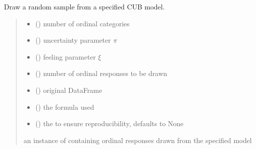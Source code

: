 \documentclass[letterpaper,10pt,english]{sphinxmanual}
\begin{document}
\begin{fulllineitems}
\label{\detokenize{cubmods:cubmods.cub.draw}}
\pysigstartsignatures
{}
\pysigstopsignatures
\sphinxAtStartPar
Draw a random sample from a specified CUB model.
\begin{quote}\begin{description}
\begin{itemize}
\item {} 
\sphinxAtStartPar
{} () \textendash{} number of ordinal categories

\item {} 
\sphinxAtStartPar
{} () \textendash{} uncertainty parameter \(\pi\)

\item {} 
\sphinxAtStartPar
{} () \textendash{} feeling parameter \(\xi\)

\item {} 
\sphinxAtStartPar
{} () \textendash{} number of ordinal responses to be drawn

\item {} 
\sphinxAtStartPar
{} () \textendash{} original DataFrame

\item {} 
\sphinxAtStartPar
{} () \textendash{} the formula used

\item {} 
\sphinxAtStartPar
{} (\sphinxstyleliteralemphasis{\sphinxupquote{, }}) \textendash{} the  to ensure reproducibility, defaults to None

\end{itemize}

\sphinxAtStartPar
an instance of  containing ordinal responses drawn from the specified model

\end{description}\end{quote}

\end{fulllineitems}
\end{document}
